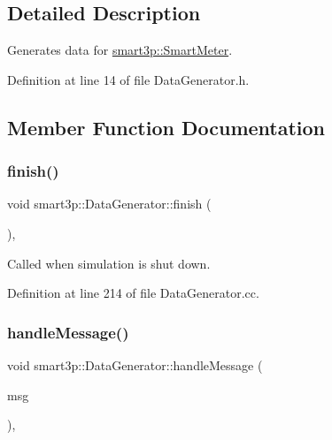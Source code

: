\subsection{Detailed Description}
Generates data for \hyperlink{classsmart3p_1_1SmartMeter}{smart3p\+::\+Smart\+Meter}. 

Definition at line 14 of file Data\+Generator.\+h.



\subsection{Member Function Documentation}
\mbox{\label{classsmart3p_1_1DataGenerator_a30cad918b7a471eeec37508e7d4a9c07}} 
\subsubsection{\texorpdfstring{finish()}{finish()}}
{\footnotesize\ttfamily void smart3p\+::\+Data\+Generator\+::finish (\begin{DoxyParamCaption}{ }\end{DoxyParamCaption})\hspace{0.3cm}{\ttfamily [protected]}, {\ttfamily [virtual]}}



Called when simulation is shut down. 



Definition at line 214 of file Data\+Generator.\+cc.

\mbox{\label{classsmart3p_1_1DataGenerator_a5a26a1e77fc192ce9024e9fad5b16a38}} 
\subsubsection{\texorpdfstring{handle\+Message()}{handleMessage()}}
{\footnotesize\ttfamily void smart3p\+::\+Data\+Generator\+::handle\+Message (\begin{DoxyParamCaption}\item[{c\+Message $\ast$}]{msg }\end{DoxyParamCaption})\hspace{0.3cm}{\ttfamily [protected]}, {\ttfamily [virtual]}}



